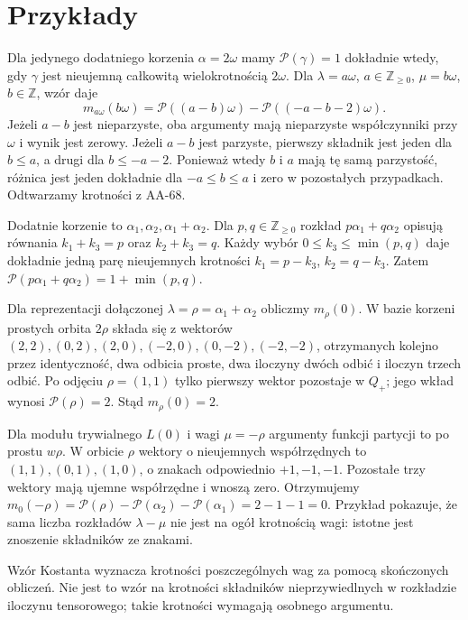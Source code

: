 \section{Przykłady}

\begin{przyklad}[Typ $A_1$]
\label{aa:prz:kostant-a1}
Dla jedynego dodatniego korzenia $\alpha=2\omega$ mamy $\mathcal P(\gamma)=1$ dokładnie wtedy, gdy $\gamma$ jest nieujemną całkowitą wielokrotnością $2\omega$. Dla $\lambda=a\omega$, $a\in\mathbb Z_{\ge0}$, $\mu=b\omega$, $b\in\mathbb Z$, wzór daje
\[
 m_{a\omega}(b\omega)=\mathcal P((a-b)\omega)
                     -\mathcal P((-a-b-2)\omega).
\]
Jeżeli $a-b$ jest nieparzyste, oba argumenty mają nieparzyste współczynniki przy $\omega$ i wynik jest zerowy. Jeżeli $a-b$ jest parzyste, pierwszy składnik jest jeden dla $b\le a$, a drugi dla $b\le-a-2$. Ponieważ wtedy $b$ i $a$ mają tę samą parzystość, różnica jest jeden dokładnie dla $-a\le b\le a$ i zero w pozostałych przypadkach. Odtwarzamy krotności z AA-68.
\end{przyklad}

\begin{przyklad}[Typ $A_2$]
\label{aa:prz:kostant-a2}
Dodatnie korzenie to $\alpha_1,\alpha_2,\alpha_1+\alpha_2$. Dla $p,q\in\mathbb Z_{\ge0}$ rozkład $p\alpha_1+q\alpha_2$ opisują równania $k_1+k_3=p$ oraz $k_2+k_3=q$. Każdy wybór $0\le k_3\le\min(p,q)$ daje dokładnie jedną parę nieujemnych krotności $k_1=p-k_3$, $k_2=q-k_3$. Zatem
$\mathcal P(p\alpha_1+q\alpha_2)=1+\min(p,q)$.

Dla reprezentacji dołączonej $\lambda=\rho=\alpha_1+\alpha_2$ obliczmy $m_\rho(0)$. W bazie korzeni prostych orbita $2\rho$ składa się z wektorów
$(2,2),(0,2),(2,0),(-2,0),(0,-2),(-2,-2)$,
otrzymanych kolejno przez identyczność, dwa odbicia proste, dwa iloczyny dwóch odbić i iloczyn trzech odbić. Po odjęciu $\rho=(1,1)$ tylko pierwszy wektor pozostaje w $Q_+$; jego wkład wynosi $\mathcal P(\rho)=2$. Stąd $m_\rho(0)=2$.

Dla modułu trywialnego $L(0)$ i wagi $\mu=-\rho$ argumenty funkcji partycji to po prostu $w\rho$. W orbicie $\rho$ wektory o nieujemnych współrzędnych to $(1,1),(0,1),(1,0)$, o znakach odpowiednio $+1,-1,-1$. Pozostałe trzy wektory mają ujemne współrzędne i wnoszą zero. Otrzymujemy
$m_0(-\rho)=\mathcal P(\rho)-\mathcal P(\alpha_2)-\mathcal P(\alpha_1)=2-1-1=0$.
Przykład pokazuje, że sama liczba rozkładów $\lambda-\mu$ nie jest na ogół krotnością wagi: istotne jest znoszenie składników ze znakami.
\end{przyklad}

Wzór Kostanta wyznacza krotności poszczególnych wag za pomocą skończonych obliczeń. Nie jest to wzór na krotności składników nieprzywiedlnych w rozkładzie iloczynu tensorowego; takie krotności wymagają osobnego argumentu.
